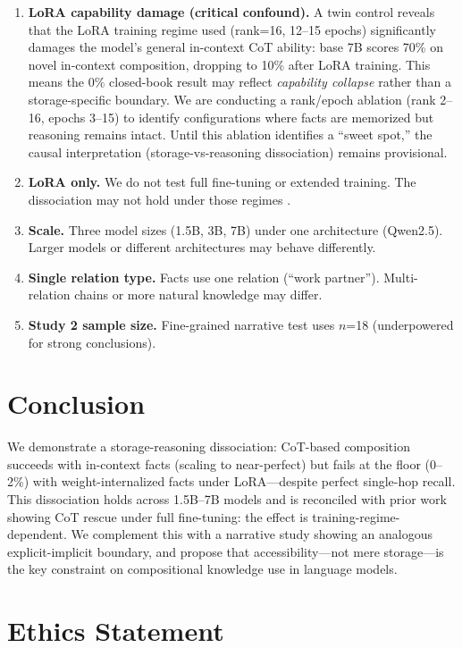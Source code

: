 \documentclass[11pt]{article}
\begin{document}
\begin{enumerate}
\item \textbf{LoRA capability damage (critical confound).} A twin control reveals that the LoRA training regime used (rank=16, 12--15 epochs) significantly damages the model's general in-context CoT ability: base 7B scores 70\% on novel in-context composition, dropping to 10\% after LoRA training. This means the 0\% closed-book result may reflect \emph{capability collapse} rather than a storage-specific boundary. We are conducting a rank/epoch ablation (rank 2--16, epochs 3--15) to identify configurations where facts are memorized but reasoning remains intact. Until this ablation identifies a ``sweet spot,'' the causal interpretation (storage-vs-reasoning dissociation) remains provisional.
\item \textbf{LoRA only.} We do not test full fine-tuning or extended training. The dissociation may not hold under those regimes \cite{balesni2024twohop,power2022grokking}.
\item \textbf{Scale.} Three model sizes (1.5B, 3B, 7B) under one architecture (Qwen2.5). Larger models or different architectures may behave differently.
\item \textbf{Single relation type.} Facts use one relation (``work partner''). Multi-relation chains or more natural knowledge may differ.
\item \textbf{Study 2 sample size.} Fine-grained narrative test uses $n$=18 (underpowered for strong conclusions).
\end{enumerate}

\section{Conclusion}

We demonstrate a storage-reasoning dissociation: CoT-based composition succeeds with in-context facts (scaling to near-perfect) but fails at the floor (0--2\%) with weight-internalized facts under LoRA---despite perfect single-hop recall. This dissociation holds across 1.5B--7B models and is reconciled with prior work showing CoT rescue under full fine-tuning: the effect is training-regime-dependent. We complement this with a narrative study showing an analogous explicit-implicit boundary, and propose that accessibility---not mere storage---is the key constraint on compositional knowledge use in language models.

\section{Ethics Statement}
\end{document}

